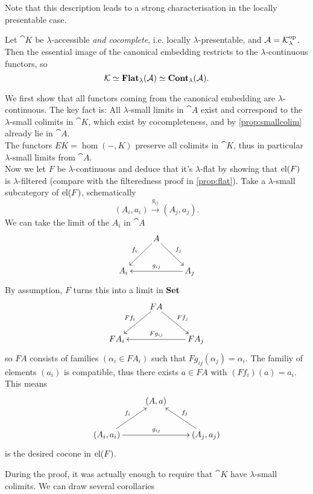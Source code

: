Note that this description leads to a strong characterisation in the locally presentable case.
\begin{Proposition}
Let $\cat K$ be $\lambda$-accessible \emph{and cocomplete}, i.e. locally $\lambda$-presentable, and $\mathcal{A} = \mathcal{K}^{\textrm{op}}_\lambda$. Then the essential image of the canonical embedding restricts to the $\lambda$-continuous functors, so 
\[ \mathcal{K} \simeq \mathbf{Flat}_\lambda(\mathcal{A}) \simeq \mathbf{Cont}_\lambda(\mathcal{A}). \]
\end{Proposition}
\begin{Proof}
We first show that all functors coming from the canonical embedding are $\lambda$-continuous. The key fact is: All $\lambda$-small limits in $\cat A$ exist and correspond to the $\lambda$-small colimits in $\cat K$, which exist by cocompleteness, and by \ref{prop:smallcolim} already lie in $\cat A$. \\

The functors $EK = \hom(-, K)$ preserve all colimits in $\cat K$, thus in particular $\lambda$-small limits from $\cat A$. \\

Now we let $F$ be $\lambda$-continuous and deduce that it's $\lambda$-flat by showing that $\textrm{el}(F)$ is $\lambda$-filtered (compare with the filteredness proof in \ref{prop:flat}). Take a $\lambda$-small subcategory of $\textrm{el}(F)$, schematically
\[ (A_i,a_i) \xrightarrow{g_{ij}} (A_j,a_j). \]
We can take the limit of the $A_i$ in $\cat A$
\[
\xymatrix{
& A \ar[ld]_{f_i} \ar[rd]^{f_j} & \\
A_i & & A_j \ar[ll]_{g_{ij}}
}\]
By assumption, $F$ turns this into a limit in $\mathbf{Set}$
\[
\xymatrix{
& FA \ar[ld]_{Ff_i} \ar[rd]^{Ff_j} & \\
FA_i & & FA_j \ar[ll]_{Fg_{ij}}
}\]
so $FA$ consists of families $(\alpha_i \in FA_i)$ such that $Fg_{ij}(\alpha_j) = \alpha_i$. The familiy of elements $(a_i)$ is compatible, thus there exists $a \in FA$ with $(Ff_i)(a) = a_i$. This means \[
\xymatrix{
& (A,a) & \\
(A_i,a_i) \ar[ru]^{f_i} \ar[rr]^{g_{ij}} & & (A_j,a_j) \ar[lu]_{f_j}
}\]
is the desired cocone in $\textrm{el}(F)$.
\end{Proof}

During the proof, it was actually enough to require that $\cat K$ have $\lambda$-small colimits. We can draw several corollaries

